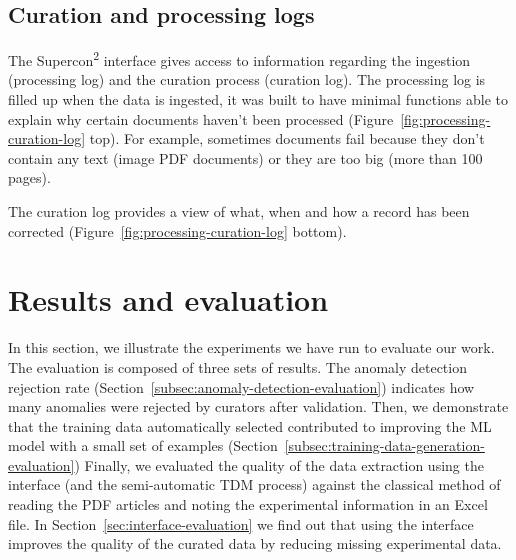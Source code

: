 \documentclass[]{interact}
\theoremstyle{plain} %
\theoremstyle{definition}
\theoremstyle{remark}
\begin{document}
\subsection{Curation and processing logs}
\label{subsec:curation-and-processing-logs}

The Supercon\textsuperscript{2} interface gives access to information regarding the ingestion (processing log) and the curation process (curation log). 
The processing log is filled up when the data is ingested, it was built to have minimal functions able to explain why certain documents haven't been processed (Figure~\ref{fig:processing-curation-log} top). 
For example, sometimes documents fail because they don't contain any text (image PDF documents) or they are too big (more than 100 pages). 


The curation log provides a view of what, when and how a record has been corrected (Figure~\ref{fig:processing-curation-log} bottom).


\section{Results and evaluation}

In this section, we illustrate the experiments we have run to evaluate our work. 
The evaluation is composed of three sets of results. 
The anomaly detection rejection rate (Section~\ref{subsec:anomaly-detection-evaluation}) indicates how many anomalies were rejected by curators after validation. 
Then, we demonstrate that the training data automatically selected contributed to improving the ML model with a small set of examples (Section~\ref{subsec:training-data-generation-evaluation}) 
Finally, we evaluated the quality of the data extraction using the interface (and the semi-automatic TDM process) against the classical method of reading the PDF articles and noting the experimental information in an Excel file. In Section~\ref{sec:interface-evaluation} we find out that using the interface improves the quality of the curated data by reducing missing experimental data. 
\end{document}
